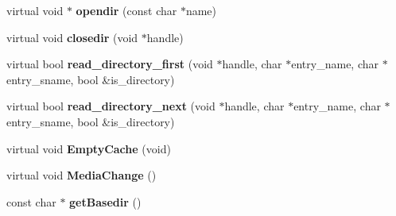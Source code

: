 \begin{DoxyCompactItemize}
\item 
\hypertarget{classlocalDrive_aa3f813f920411f56cf194d815c68be41}{virtual void $\ast$ {\bfseries opendir} (const char $\ast$name)}\label{classlocalDrive_aa3f813f920411f56cf194d815c68be41}

\item 
\hypertarget{classlocalDrive_a62a8cc9aaae8084654a192f597673938}{virtual void {\bfseries closedir} (void $\ast$handle)}\label{classlocalDrive_a62a8cc9aaae8084654a192f597673938}

\item 
\hypertarget{classlocalDrive_a76a1484aa6b09ad942f5ad9e96410120}{virtual bool {\bfseries read\-\_\-directory\-\_\-first} (void $\ast$handle, char $\ast$entry\-\_\-name, char $\ast$entry\-\_\-sname, bool \&is\-\_\-directory)}\label{classlocalDrive_a76a1484aa6b09ad942f5ad9e96410120}

\item 
\hypertarget{classlocalDrive_ad4f2b5f3e42a18c15781bb8d26e3cfd1}{virtual bool {\bfseries read\-\_\-directory\-\_\-next} (void $\ast$handle, char $\ast$entry\-\_\-name, char $\ast$entry\-\_\-sname, bool \&is\-\_\-directory)}\label{classlocalDrive_ad4f2b5f3e42a18c15781bb8d26e3cfd1}

\item 
\hypertarget{classlocalDrive_a9fff98a140e946d23d9f8b2bbedb2649}{virtual void {\bfseries Empty\-Cache} (void)}\label{classlocalDrive_a9fff98a140e946d23d9f8b2bbedb2649}

\item 
\hypertarget{classlocalDrive_afaa833624d219a745861ab746e9cea77}{virtual void {\bfseries Media\-Change} ()}\label{classlocalDrive_afaa833624d219a745861ab746e9cea77}

\item 
\hypertarget{classlocalDrive_ad31747d53f04fb8538c6f9f5059df1d9}{const char $\ast$ {\bfseries get\-Basedir} ()}\label{classlocalDrive_ad31747d53f04fb8538c6f9f5059df1d9}

\end{DoxyCompactItemize}

